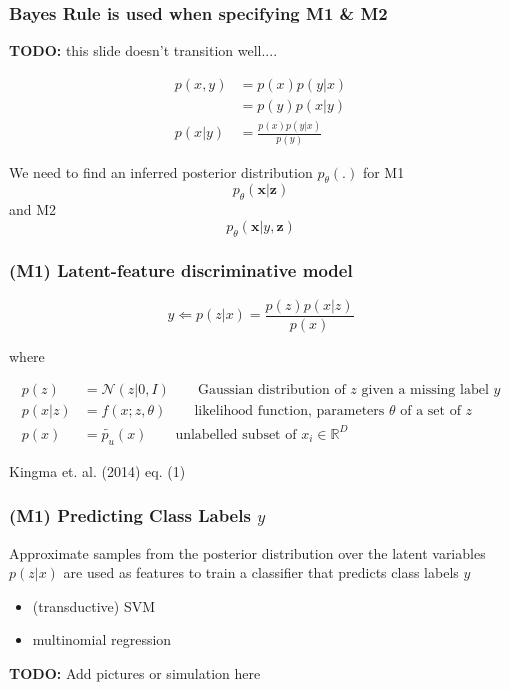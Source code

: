 \documentclass{beamer}
\begin{document}
\begin{frame}
  \frametitle{Bayes Rule is used when specifying M1 \& M2}

  \textbf{TODO:} this slide doesn't transition well....

  \begin{align*}
    p(x,y) &= p(x)p(y|x) \\
    &= p(y)p(x|y) \\
    p(x|y) &= \frac{p(x)p(y|x)}{p(y)}
  \end{align*}

  We need to find an inferred posterior distribution $p_\theta (.)$ \newline
  for M1 \footnotemark
  \[p_\theta (\mathbf{x}|\mathbf{z})\] and
  M2 \footnotemark \[p_\theta (\mathbf{x}|y, \mathbf{z})\]


  
\end{frame}

\begin{frame}
  \frametitle{(M1) Latent-feature discriminative model}

  \[
  y \Leftarrow   p(z|x) = \frac{p(z)p(x|z)}{p(x)}
  \]

  where

  \begin{align*}
    p(z) &= \mathcal{N}(z|0,I) \qquad \text{Gaussian distribution of $z$ given a missing label $y$}\\
    p(x|z) &= f(x;z,\theta) \qquad \text{likelihood function, parameters
      $\theta$ of a set of $z$} \\
    p(x) &= \tilde{p_u}(x) \qquad \text{unlabelled subset of $x_i \in \mathbb{R}^D$}
    \end{align*}

  Kingma et. al. (2014) eq. (1)
\end{frame}

\begin{frame}
  \frametitle{(M1) Predicting Class Labels $y$}

  Approximate samples from the posterior distribution over the
  latent variables $p(z|x)$ are used as features to train a
  classifier that predicts class labels $y$

  \begin{itemize}
  \item (transductive) SVM
  \item multinomial regression
  \end{itemize}

  \textbf{TODO:} Add pictures or simulation here
  
\end{frame}
\end{document}
